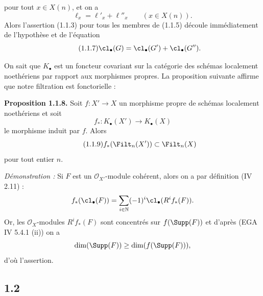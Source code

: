 pour tout $x\in X(n)$, et on a
\begin{equation}\tag{1.1.6}
\ell_x=\ell'_x+\ell''_x\qquad (x\in X(n)).
\end{equation}
Alors l'assertion (1.1.3) pour tous les membres de (1.1.5) découle immédiatement de l'hypothèse et de l'équation
\begin{equation}\tag{1.1.7}
\cl_\bullet(G)=\cl_\bullet(G')+\cl_\bullet(G'').
\end{equation}

On sait que $K_\bullet$ est un foncteur covariant sur la catégorie des schémas localement noethériens par rapport aux morphismes propres. La proposition suivante affirme que notre filtration est fonctorielle :

\textbf{Proposition 1.1.8.} Soit $f:X'\to X$ un morphisme propre de schémas localement noethériens et soit
\[
f_*:K_\bullet(X')\longrightarrow K_\bullet(X)
\]
le morphisme induit par $f$. Alors
\begin{equation}\tag{1.1.9}
f_*(\Filt_n(X'))\subset\Filt_n(X)
\end{equation}
pour tout entier $n$.

\emph{Démonstration :} Si $F$ est un $\mathcal O_{X'}$-module cohérent, alors on a par définition (IV 2.11) :
\[
f_*(\cl_\bullet(F))=\sum_{i\in\mathbb N}(-1)^i\cl_\bullet(R^if_*(F)).
\]
Or, les $\mathcal O_X$-modules $R^if_*(F)$ sont concentrés sur $f(\Supp(F))$ et d'après (EGA IV 5.4.1 (ii)) on a
\[
\dim(\Supp(F))\geq\dim(f(\Supp(F))),
\]
d'où l'assertion.

\subsection*{1.2}
